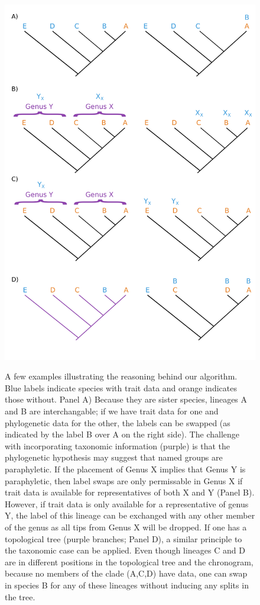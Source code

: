 \documentclass[a4paper,11pt]{article}
\begin{document}
\begin{figure}[p]
\includegraphics[scale=0.7]{figs/algo-description}
\caption{}
\label{fig:algo}
\end{figure}

\addtocounter{figure}{-1}
\begin{figure} [p]
  \caption{A few examples illustrating the reasoning behind our algorithm. Blue labels indicate species with trait data and orange indicates those without. Panel A) Because they are sister species, lineages A and B are interchangable; if we have trait data for one and phylogenetic data for the other, the labels can be swapped (as indicated by the label B over A on the right side). The challenge with incorporating taxonomic information (purple) is that the phylogenetic hypothesis may suggest that named groups are paraphyletic. If the placement of Genus X implies that Genus Y is paraphyletic, then label swaps are only permissable in Genus X if trait data is available for representatives of both X and Y (Panel B). However, if trait data is only available for a representative of genus Y, the label of this lineage can be exchanged with any other member of the genus as all tips from Genus X will be dropped. If one has a topological tree (purple branches; Panel D), a similar principle to the taxonomic case can be applied. Even though lineages C and D are in different positions in the topological tree and the chronogram, because no members of the clade (A,C,D) have data, one can swap in species B for any of these lineages without inducing any splits in the tree.}
\end{figure}
\end{document}
